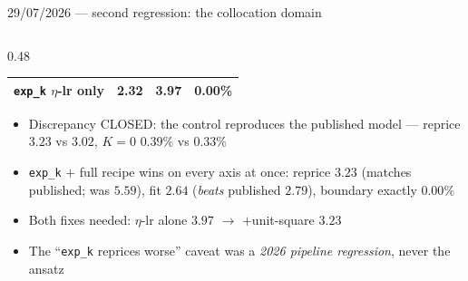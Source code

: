 \documentclass[aspectratio=169,11pt]{beamer}
\newcommand{\gold}[1]{{\color{ntugold}#1}}
\newcommand{\red}[1]{{\color{ntured}#1}}
\begin{document}
\begin{frame}{29/07/2026 --- second regression: the collocation domain}
\begin{columns}[T]
\begin{column}{0.48\linewidth}
\begin{center}
\begin{tabular}{lrrr}
        \texttt{exp\_k} $\eta$-lr only & 2.32 & 3.97 & 0.00\% \\
        \bottomrule
      \end{tabular}
      \end{center}
      \begin{itemize}\scriptsize
        \item \gold{Discrepancy CLOSED}: the control reproduces the published model ---
              reprice $3.23$ vs $3.02$, $K{=}0$ $0.39\%$ vs $0.33\%$
        \item \red{\texttt{exp\_k} $+$ full recipe wins on every axis at once}: reprice
              $3.23$ (matches published; was $5.59$), fit $2.64$ (\emph{beats} published
              $2.79$), boundary exactly $0.00\%$
        \item Both fixes needed: $\eta$-lr alone $3.97$ $\to$ $+$unit-square $3.23$
        \item The ``\texttt{exp\_k} reprices worse'' caveat was a \emph{2026 pipeline
              regression}, never the ansatz
      \end{itemize}
    \end{column}
  \end{columns}
\end{frame}

\end{document}
